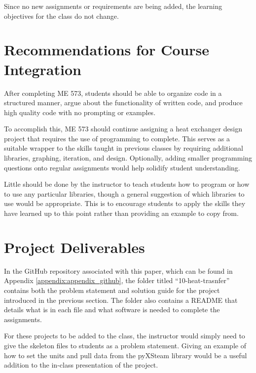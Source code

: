 Since no new assignments or requirements are being added, the learning objectives
for the class do not change. 

\section{Recommendations for Course Integration}

After completing ME 573, students should be able to organize code in a structured manner, 
argue about the functionality of written code, and produce high quality code with no prompting
or examples.

To accomplish this, ME 573 should continue assigning a heat exchanger design project that 
requires the use of programming to complete. This serves as a suitable wrapper to the skills
taught in previous classes by requiring additional libraries, graphing, iteration, and design.
Optionally, adding smaller programming questions onto regular assignments would help solidify
student understanding. 

Little should be done by the instructor to teach students how to program or how to use any
particular libraries, though a general suggestion of which libraries to use would be appropriate.
This is to encourage students to apply the skills they have learned up to this point rather than
providing an example to copy from. 

\section{Project Deliverables}

In the GitHub repository associated with this paper, which can be found in 
Appendix \ref{appendix:appendix_github}, the folder titled ``10-heat-trasnfer''
contains both the problem statement and solution guide for the project introduced in 
the previous section. The folder also contains a README that details what is in each file and 
what software is needed to complete the assignments. 

For these projects to be added to the class, the instructor would simply need to give the 
skeleton files to students as a problem statement. Giving an example of how to set the units
and pull data from the pyXSteam library would be a useful addition to the in-class presentation
of the project.
